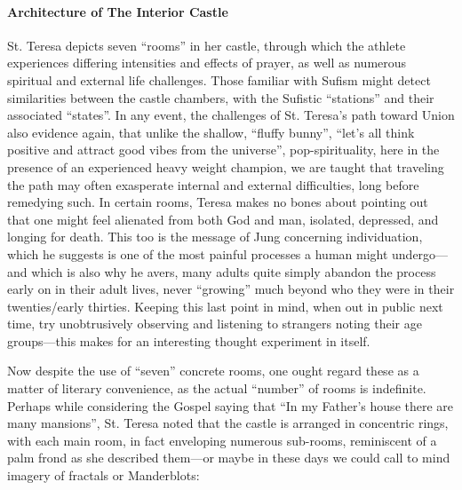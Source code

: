 \paragraph{Architecture of The Interior Castle}


St. Teresa depicts seven ``rooms'' in her castle, through which the athlete experiences differing intensities and effects of prayer, as well as numerous spiritual and external life challenges. Those familiar with Sufism might detect similarities between the castle chambers, with the Sufistic ``stations'' and their associated ``states''. In any event, the challenges of St. Teresa's path toward Union also evidence again, that unlike the shallow, ``fluffy bunny'', ``let's all think positive and attract good vibes from the universe'', pop-spirituality, here in the presence of an experienced heavy weight champion, we are taught that traveling the path may often exasperate internal and external difficulties, long before remedying such. In certain rooms, Teresa makes no bones about pointing out that one might feel alienated from both God and man, isolated, depressed, and longing for death. This too is the message of Jung concerning individuation, which he suggests is one of the most painful processes a human might undergo---and which is also why he avers, many adults quite simply abandon the process early on in their adult lives, never ``growing'' much beyond who they were in their twenties/early thirties. Keeping this last point in mind, when out in public next time, try unobtrusively observing and listening to strangers noting their age groups---this makes for an interesting thought experiment in itself.

Now despite the use of ``seven'' concrete rooms, one ought regard these as a matter of literary convenience, as the actual ``number'' of rooms is indefinite. Perhaps while considering the Gospel saying that ``In my Father's house there are many mansions'', St. Teresa noted that the castle is arranged in concentric rings, with each main room, in fact enveloping numerous sub-rooms, reminiscent of a palm frond as she described them---or maybe in these days we could call to mind imagery of fractals or Manderblots:

